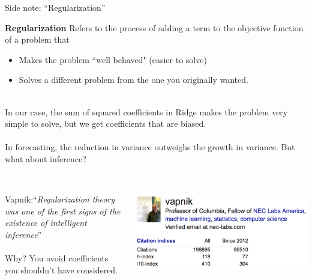 \documentclass[mathserif, aspectratio=169]{beamer}
\begin{document}
\begin{frame}{Side note:  ``Regularization''}

\textbf{Regularization} Refers to the process of adding a term to the objective function of a problem that 
\begin{itemize}
\item Makes the problem ``well behaved" (easier to solve)
\item Solves a different problem from the one you originally wanted.\\~\\
\end{itemize}

In our case, the sum of squared coefficients in Ridge makes the problem very simple to solve, but we get coefficients that are biased.\\~\\

In forecasting, the reduction in variance outweighs the growth in variance.  But what about inference? \\~\\

\pause

\begin{columns}

Vapnik:``\textit{Regularization theory was one of the first signs of the existence of intelligent inference}''\\~\\

Why?  You avoid coefficients you shouldn't have considered.

\includegraphics[scale=0.4]{vapnik}
\end{columns}
\end{frame}
\end{document}
